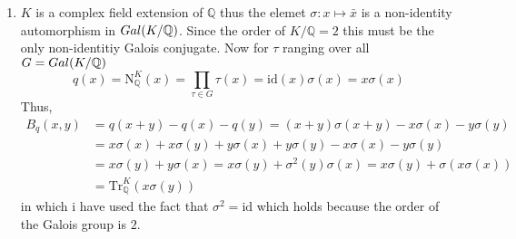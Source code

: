 \documentclass[12pt]{extarticle}
\newcommand{\C}{\mathbb{C}}
\newcommand{\Q}{\mathbb{Q}}
\newcommand{\galgroup}[1]{Gal \small(#1 \small)}
\newcommand{\qnorm}[2]{\mathrm{N}^{#1}_{\Q}\left(#2\right)}
\begin{document}
\begin{enumerate}
\begin{enumerate}
\begin{align*}
\begin{pmatrix}
q\left( \frac{1 + \sqrt{-d}}{2} + 1 \right) - q\left( \frac{1 + \sqrt{-d}}{2} \right) - q(1) & q\left( \frac{1 + \sqrt{-d}}{2} + \frac{1 + \sqrt{-d}}{2} \right) - q\left( \frac{1 + \sqrt{-d}}{2} \right) - q\left( \frac{1 + \sqrt{-d}}{2} \right) 		
\end{pmatrix} \\ &= 
\begin{pmatrix}
4 - 1 - 1 & \frac{9}{4} + \frac{d}{4} - 1 - \left(\frac{1}{4} + \frac{d}{4}\right) \\
\frac{9}{4} + \frac{d}{4} - \left(\frac{1}{4} + \frac{d}{4}\right) - 1 & 1 + d - \left(\frac{1}{4} + \frac{d}{4}\right) - \left(\frac{1}{4} + \frac{d}{4}\right)	
\end{pmatrix} = 
\begin{pmatrix}
2 & 1 \\
1 & \frac{1 + d}{2}		
\end{pmatrix}
\end{align*}
Thus, the discriminant, $\Delta_q = - \det{B} = - d$. Therefore, in either case, $\Delta_q = \Delta_d$. Both quadratic forms are postivie definite due to the positive definiteness of the complex conjugate norm on $\C$ i.e. $z \neq 0 \implies z \bar{z} > 0$ so $x \neq 0 \implies q(x) = \qnorm{K}{x} = x \bar{x} > 0.$ These are equivalent because the only non identity Galois conjugate in an order two complex field extension is complex conjugation and thus $\qnorm{K}{x} = x \sigma(x) = x \bar{x}$. 

\item $K$ is a complex field extension of $\Q$ thus the elemet $\sigma : x \mapsto \bar{x}$ is a non-identity automorphism in $\galgroup{K/\Q}$. Since the order of $K/\Q = 2$ this must be the only non-identitiy Galois conjugate. Now for $\tau$ ranging over all $ G = \galgroup{K/\Q}$ \[q(x) = \qnorm{K}{x} = \prod_{\tau \in G} \tau(x) = \mathrm{id}(x) \sigma(x) = x \sigma(x)\]
Thus, 
\begin{align*}
B_q(x, y) &= q(x + y) - q(x) - q(y) = (x + y) \sigma(x + y) - x \sigma(x) - y \sigma(y) \\ &= x \sigma(x) + x \sigma(y) + y \sigma(x) + y \sigma(y) - x \sigma(x) - y \sigma(y) \\ &= x \sigma(y) + y \sigma(x) = x \sigma(y) + \sigma^2(y) \sigma(x) = x \sigma(y) + \sigma(x \sigma(x)) \\ & = \mathrm{Tr}_{\Q}^{K}(x \sigma(y))
\end{align*}
in which i have used the fact that $\sigma^2 = \mathrm{id}$ which holds because the order of the Galois group is $2$.


\end{enumerate}
\end{enumerate}
\end{document}
